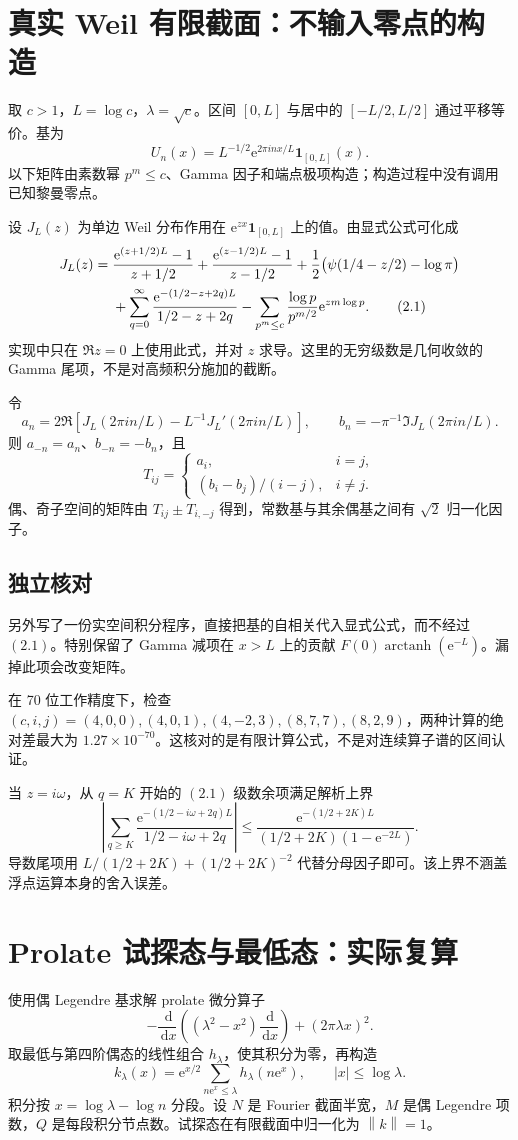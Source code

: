 \documentclass[UTF8,fontset=none,11pt,a4paper]{ctexart}
\newcommand{\dd}{\,\mathrm d}\newcommand{\e}{\mathrm e}\newcommand{\norm}[1]{\left\lVert#1\right\rVert}
\begin{document}
\section{真实 Weil 有限截面：不输入零点的构造}
取 $c>1$，$L=\log c$，$\lambda=\sqrt c$。区间 $[0,L]$ 与居中的 $[-L/2,L/2]$ 通过平移等价。基为
\[
 U_n(x)=L^{-1/2}\e^{2\pi inx/L}\mathbf1_{[0,L]}(x).
\]
以下矩阵由素数幂 $p^m\le c$、Gamma 因子和端点极项构造；构造过程中没有调用已知黎曼零点。

设 $J_L(z)$ 为单边 Weil 分布作用在 $\e^{zx}\mathbf1_{[0,L]}$ 上的值。由显式公式可化成
\begin{align}
 J_L(z)={}&\frac{\e^{(z+1/2)L}-1}{z+1/2}
          +\frac{\e^{(z-1/2)L}-1}{z-1/2}
          +\frac12\bigl(\psi(1/4-z/2)-\log\pi\bigr)\notag\\
 &+\sum_{q=0}^{\infty}
       \frac{\e^{-(1/2-z+2q)L}}{1/2-z+2q}
   -\sum_{p^m\le c}\frac{\log p}{p^{m/2}}\e^{zm\log p}. \tag{2.1}
\end{align}
实现中只在 $\Re z=0$ 上使用此式，并对 $z$ 求导。这里的无穷级数是几何收敛的 Gamma 尾项，不是对高频积分施加的截断。

令
\[
 a_n=2\Re\left[J_L(2\pi in/L)-L^{-1}J_L'(2\pi in/L)\right],
 \qquad b_n=-\pi^{-1}\Im J_L(2\pi in/L).
\]
则 $a_{-n}=a_n$、$b_{-n}=-b_n$，且
\[
 T_{ij}=\begin{cases}a_i,&i=j,\\
 (b_i-b_j)/(i-j),&i\ne j.
 \end{cases} \tag{2.2}
\]
偶、奇子空间的矩阵由 $T_{ij}\pm T_{i,-j}$ 得到，常数基与其余偶基之间有 $\sqrt2$ 归一化因子。

\subsection*{独立核对}
另外写了一份实空间积分程序，直接把基的自相关代入显式公式，而不经过 $(2.1)$。特别保留了 Gamma 减项在 $x>L$ 上的贡献 $F(0)\operatorname{arctanh}(\e^{-L})$。漏掉此项会改变矩阵。

在 70 位工作精度下，检查 $(c,i,j)=(4,0,0),(4,0,1),(4,-2,3),(8,7,7),(8,2,9)$，两种计算的绝对差最大为 $1.27\times10^{-70}$。这核对的是有限计算公式，不是对连续算子谱的区间认证。

当 $z=i\omega$，从 $q=K$ 开始的 $(2.1)$ 级数余项满足解析上界
\[
 \left|\sum_{q\ge K}\frac{\e^{-(1/2-i\omega+2q)L}}{1/2-i\omega+2q}\right|
 \le\frac{\e^{-(1/2+2K)L}}
 {(1/2+2K)(1-\e^{-2L})}. \tag{2.3}
\]
导数尾项用 $L/(1/2+2K)+(1/2+2K)^{-2}$ 代替分母因子即可。该上界不涵盖浮点运算本身的舍入误差。

\section{Prolate 试探态与最低态：实际复算}
使用偶 Legendre 基求解 prolate 微分算子
\[
 -\frac{\dd}{\dd x}\left((\lambda^2-x^2)\frac{\dd}{\dd x}\right)
 +(2\pi\lambda x)^2.
\]
取最低与第四阶偶态的线性组合 $h_\lambda$，使其积分为零，再构造
\[
 k_\lambda(x)=\e^{x/2}\sum_{n\e^x\le\lambda}h_\lambda(n\e^x),
 \qquad |x|\le\log\lambda. \tag{3.1}
\]
积分按 $x=\log\lambda-\log n$ 分段。设 $N$ 是 Fourier 截面半宽，$M$ 是偶 Legendre 项数，$Q$ 是每段积分节点数。试探态在有限截面中归一化为 $\norm{k}=1$。
\end{document}
